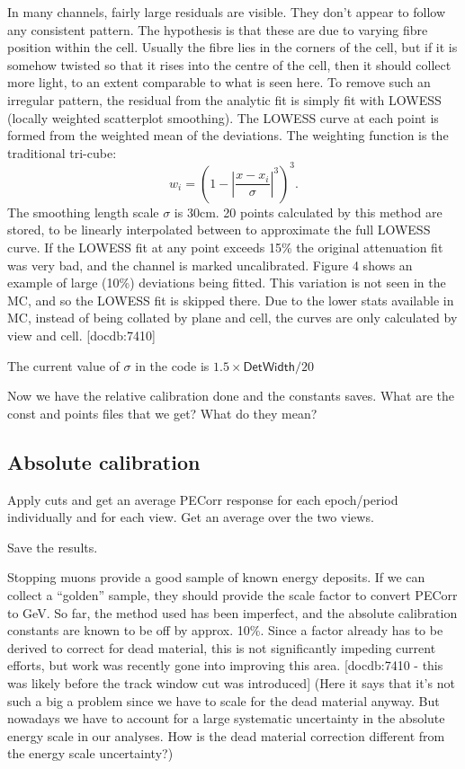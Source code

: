 \documentclass[12pt,a4paper]{article}
\begin{document}
In many channels, fairly large residuals are visible. They don’t appear to follow any consistent pattern. The hypothesis is that these are due to varying fibre position within the cell. Usually the fibre lies in the corners of the cell, but if it is somehow twisted so that it rises into the centre of the cell, then it should collect more light, to an extent comparable to what is seen here. To remove such an irregular pattern, the residual from the analytic fit is simply fit with LOWESS (locally weighted scatterplot smoothing). The LOWESS curve at each point is formed from the weighted mean of the deviations. The weighting function is the traditional tri-cube:
\begin{equation}
w_i=\left(1-\left|\frac{x-x_i}{\sigma}\right|^3\right)^3.
\end{equation}
The smoothing length scale $\sigma$ is 30cm. 20 points calculated by this method are stored, to be linearly interpolated between to approximate the full LOWESS curve. If the LOWESS fit at any point exceeds 15\% the original attenuation fit was very bad, and the channel is marked uncalibrated. Figure 4 shows an example of large (10\%) deviations being fitted. This variation is not seen in the MC, and so the LOWESS fit is skipped there. Due to the lower stats available in MC, instead of being collated by plane and cell, the curves are only calculated by view and cell. [docdb:7410]

The current value of $\sigma$ in the code is $1.5\times\textsf{DetWidth}/20$

Now we have the relative calibration done and the constants saves. What are the const and points files that we get? What do they mean?

\subsection{Absolute calibration}

Apply cuts and get an average PECorr response for each epoch/period individually and for each view. Get an average over the two views.

Save the results.

Stopping muons provide a good sample of known energy deposits. If we can collect a “golden” sample, they should provide the scale factor to convert PECorr to GeV. So far, the method used has been imperfect, and the absolute calibration constants are known to be off by approx. 10\%. Since a factor already has to be derived to correct for dead material, this is not significantly impeding current efforts, but work was recently gone into improving this area. [docdb:7410 - this was likely before the track window cut was introduced]
(Here it says that it's not such a big a problem since we have to scale for the dead material anyway. But nowadays we have to account for a large systematic uncertainty in the absolute energy scale in our analyses. How is the dead material correction different from the energy scale uncertainty?)
\end{document}
